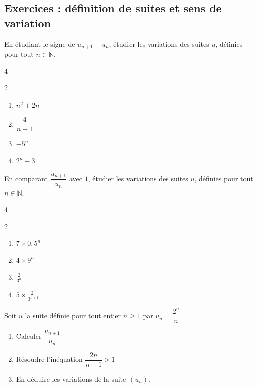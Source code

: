 \documentclass[main.tex]{subfiles}
\begin{document}
\subsection{Exercices : définition de suites et sens de variation} 
\begin{exercise} En étudiant le signe de $u_{n+1}-u_n$, étudier les variations des suites $u$, définies pour tout   $n\in\mathbb{N}$.
		\begin{multicols}{4}
		\begin{spacing}{2} 
			\begin{enumerate}[label={\arabic*)$u_n=$}, leftmargin=*]
				\item $  n^2+2n$ 
				\item $  \dfrac{4}{n+1}$ 
				\item $ -5^n$ 
				\item $2^n-3$ 
			\end{enumerate} 
		\end{spacing}
	\end{multicols}  
\end{exercise} 
\begin{exercise}  En comparant $\dfrac{u_{n+1}}{u_{n}}$ avec $1$, étudier les variations des suites $u$, définies pour tout   $n\in\mathbb{N}$.
	\begin{multicols}{4}
		\begin{spacing}{2} 
			\begin{enumerate}[label={\arabic*)$u_n=$}, leftmargin=*]
				\item $ 7 \times 0,5^n$ 
				\item $  4 \times 9^n$ 
				\item $  \frac{2}{3^n}$ 
				\item $5\times \frac{2^n}{3^{n+1}}$  
			\end{enumerate} 
		\end{spacing}
	\end{multicols}  
\end{exercise}
\begin{exercise} Soit $u$ la suite définie pour tout entier $n \geqslant 1$ par $u_n = \dfrac{2^n}{n}$
	\begin{enumerate}[label={\arabic*)}, leftmargin=*]
		\item Calculer $\dfrac{u_{n+1}}{u_{n}}$
		\item Résoudre l'inéquation $\dfrac{2n}{n+1} > 1$
		\item En déduire les variations de la suite $(u_n)$.
	\end{enumerate} 
\end{exercise}
\end{document}
